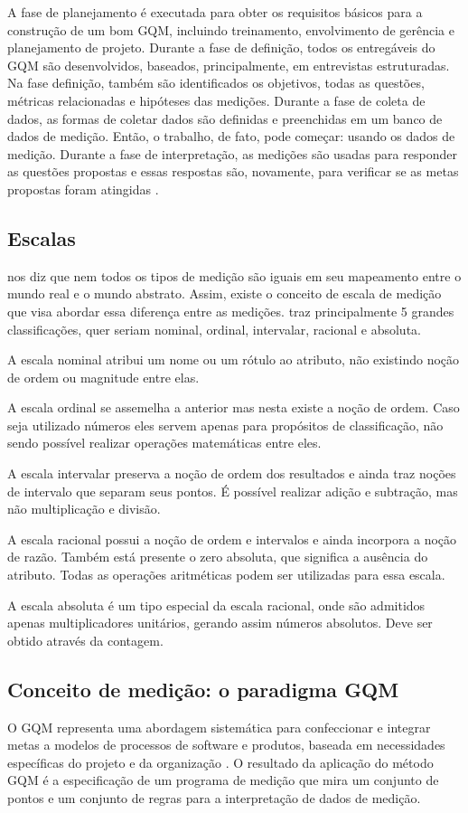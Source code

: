 A fase de planejamento é executada para obter os requisitos básicos para a
construção de um bom GQM, incluindo treinamento, envolvimento de gerência e
planejamento de projeto. Durante a fase de definição, todos os entregáveis do
GQM são desenvolvidos, baseados, principalmente, em entrevistas estruturadas.
Na fase definição, também são identificados os objetivos, todas as questões,
métricas relacionadas e hipóteses das medições. Durante a fase de coleta de
dados, as formas de coletar dados são definidas e preenchidas em um banco de
dados de medição. Então, o trabalho, de
fato, pode começar: usando os dados de medição. Durante a fase de interpretação,
as medições são usadas para responder as questões propostas e essas respostas são,
novamente, para verificar se as metas propostas foram atingidas \cite{egon}.


\subsection{Escalas}
\cite{fenton} nos diz que nem todos os tipos de medição são iguais em seu mapeamento
entre o mundo real e o mundo abstrato. Assim, existe o conceito de escala de
medição que visa abordar essa diferença entre as medições. \cite{fenton} traz principalmente
5 grandes classificações, quer seriam nominal, ordinal, intervalar, racional e
absoluta.

A escala nominal atribui um nome ou um rótulo ao atributo, não existindo noção
de ordem ou magnitude entre elas.

A escala ordinal se assemelha a anterior mas nesta existe a noção de ordem. Caso
seja utilizado números eles servem apenas para propósitos de classificação, não
sendo possível realizar operações matemáticas entre eles.

A escala intervalar preserva a noção de ordem dos resultados e ainda traz noções
de intervalo que separam seus pontos. É possível realizar adição e subtração, mas
não multiplicação e divisão.

A escala racional possui a noção de ordem e intervalos e ainda incorpora a noção
de razão. Também está presente o zero absoluta, que significa a ausência do atributo.
Todas as operações aritméticas podem ser utilizadas para essa escala.

A escala absoluta é um tipo especial da escala racional, onde são admitidos apenas
multiplicadores unitários, gerando assim números absolutos. Deve ser obtido
através da contagem.


\subsection{Conceito de medição: o paradigma GQM}
O GQM representa uma abordagem sistemática para confeccionar e integrar metas a
modelos de processos de software e produtos, baseada em necessidades específicas
do projeto e da organização \cite{basiliRombach}. O resultado da aplicação do
método GQM é a especificação de um programa de medição que mira um conjunto de
pontos e um conjunto de regras para a interpretação de dados de medição.

